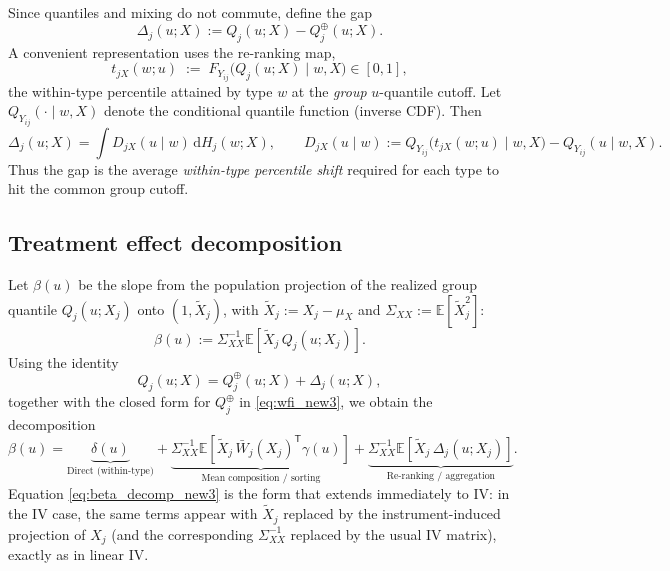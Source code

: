 \documentclass[12pt]{article}
\newcommand{\E}{\mathbb{E}}
\newcommand{\T}{\mathsf{T}} %
\newcommand{\dd}{\mathrm{d}} %
\begin{document}
Since quantiles and mixing do not commute, define the gap
\begin{equation}\label{eq:Delta_new3}
\Delta_j(u;X):=Q_j(u;X)-Q_j^{\oplus}(u;X).
\end{equation}
A convenient representation uses the re-ranking map,
\begin{equation}\label{eq:rerank_map_new3}
t_{jX}(w;u)\;:=\;F_{Y_{ij}}\!\big(Q_j(u;X)\mid w,X\big)\in[0,1],
\end{equation}
the within-type percentile attained by type $w$ at the \emph{group} $u$-quantile cutoff. Let $Q_{Y_{ij}}(\cdot\mid w,X)$ denote the conditional quantile function (inverse CDF). Then
\begin{equation}\label{eq:Delta_as_D_new3}
\Delta_j(u;X)=\int D_{jX}(u\mid w)\,\dd H_j(w;X),
\qquad
D_{jX}(u\mid w):=
Q_{Y_{ij}}\!\big(t_{jX}(w;u)\mid w,X\big)-Q_{Y_{ij}}(u\mid w,X).
\end{equation}
Thus the gap is the average \emph{within-type percentile shift} required for each type to hit the common group cutoff.


\subsection{Treatment effect decomposition}

Let $\beta(u)$ be the slope from the population projection of the realized group quantile $Q_j(u;X_j)$ onto $(1,\tilde X_j)$, with $\tilde X_j:=X_j-\mu_X$ and $\Sigma_{XX}:=\E[\tilde X_j^2]$:
\begin{equation}\label{eq:beta_proj_new3}
\beta(u):=\Sigma_{XX}^{-1}\E\!\left[\tilde X_j\,Q_j(u;X_j)\right].
\end{equation}
Using the identity
\begin{equation}\label{eq:Q_split_new3}
Q_j(u;X)=Q_j^{\oplus}(u;X)+\Delta_j(u;X),
\end{equation}
together with the closed form for $Q_j^{\oplus}$ in \eqref{eq:wfi_new3}, we obtain the decomposition
\begin{equation}\label{eq:beta_decomp_new3}
\beta(u)
=
\underbrace{\delta(u)}_{\text{Direct (within-type)}}
+
\underbrace{\Sigma_{XX}^{-1}\E\!\left[\tilde X_j\,\bar W_j(X_j)^{\T}\gamma(u)\right]}_{\text{Mean composition / sorting}}
+
\underbrace{\Sigma_{XX}^{-1}\E\!\left[\tilde X_j\,\Delta_j(u;X_j)\right]}_{\text{Re-ranking / aggregation}}
.
\end{equation}
Equation \eqref{eq:beta_decomp_new3} is the form that extends immediately to IV: in the IV case, the same terms appear with $\tilde X_j$ replaced by the instrument-induced projection of $X_j$ (and the corresponding $\Sigma_{XX}^{-1}$ replaced by the usual IV matrix), exactly as in linear IV.
\end{document}

